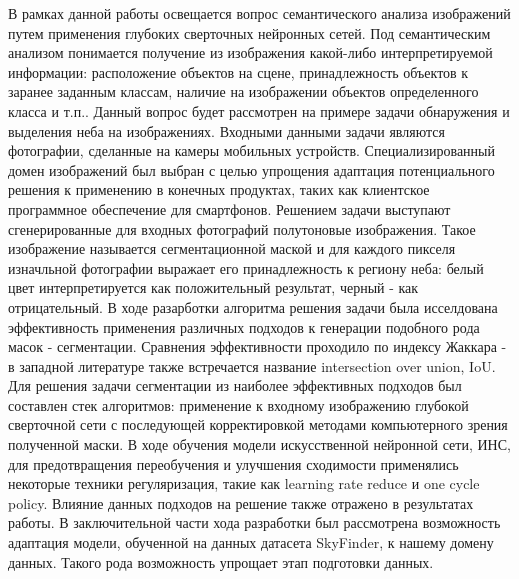 





\Intro

В рамках данной работы освещается вопрос семантического анализа изображений путем применения глубоких сверточных нейронных сетей. Под семантическим анализом понимается получение из изображения какой-либо интерпретируемой информации: расположение объектов на сцене, принадлежность объектов к заранее заданным классам, наличие на изображении объектов определенного класса и т.п.. Данный вопрос будет рассмотрен на примере задачи обнаружения и выделения неба на изображениях. Входными данными задачи являются фотографии, сделанные на камеры мобильных устройств. Специализированный домен изображений был выбран с целью упрощения адаптация потенциального решения к применению в конечных продуктах, таких как клиентское программное обеспечение для смартфонов. Решением задачи выступают сгенерированные для входных фотографий полутоновые изображения. Такое изображение называется сегментационной маской и для каждого пикселя изначльной фотографии выражает его принадлежность к региону неба: белый цвет интерпретируется как положительный результат, черный - как отрицательный. В ходе разарботки алгоритма решения задачи была исселдована эффективность применения различных подходов к генерации подобного рода масок - сегментации. Сравнения эффективности проходило по индексу Жаккара - в западной литературе также встречается название intersection over union, IoU. Для решения задачи сегментации из наиболее эффективных подходов был составлен стек алгоритмов: применение к входному изображению глубокой сверточной сети с последующей корректировкой методами компьютерного зрения полученной маски. В ходе обучения модели искусственной нейронной сети, ИНС, для предотвращения переобучения и улучшения сходимости применялись некоторые техники регуляризация, такие как learning rate reduce и one cycle policy. Влияние данных подходов на решение также отражено в результатах работы. В заключительной части хода разработки был рассмотрена возможность адаптация модели, обученной на данных датасета SkyFinder, к нашему домену данных. Такого рода возможность упрощает этап подготовки данных.

